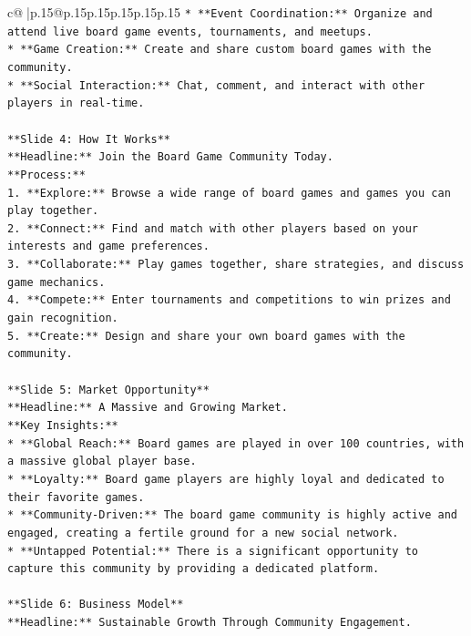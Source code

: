 \documentclass{article}
\begin{document}
{\begin{supertabular}{c@{$\;$}|p{.15\linewidth}@{}p{.15\linewidth}p{.15\linewidth}p{.15\linewidth}p{.15\linewidth}p{.15\linewidth}}
{{{\texttt{*   **Event Coordination:** Organize and attend live board game events, tournaments, and meetups.} \\
\texttt{*   **Game Creation:** Create and share custom board games with the community.} \\
\texttt{*   **Social Interaction:** Chat, comment, and interact with other players in real{-}time.} \\
\\ 
\texttt{**Slide 4: How It Works**} \\
\texttt{**Headline:** Join the Board Game Community Today.} \\
\texttt{**Process:**} \\
\texttt{1.  **Explore:** Browse a wide range of board games and games you can play together.} \\
\texttt{2.  **Connect:** Find and match with other players based on your interests and game preferences.} \\
\texttt{3.  **Collaborate:** Play games together, share strategies, and discuss game mechanics.} \\
\texttt{4.  **Compete:** Enter tournaments and competitions to win prizes and gain recognition.} \\
\texttt{5.  **Create:** Design and share your own board games with the community.} \\
\\ 
\texttt{**Slide 5: Market Opportunity**} \\
\texttt{**Headline:** A Massive and Growing Market.} \\
\texttt{**Key Insights:**} \\
\texttt{*   **Global Reach:** Board games are played in over 100 countries, with a massive global player base.} \\
\texttt{*   **Loyalty:** Board game players are highly loyal and dedicated to their favorite games.} \\
\texttt{*   **Community{-}Driven:** The board game community is highly active and engaged, creating a fertile ground for a new social network.} \\
\texttt{*   **Untapped Potential:** There is a significant opportunity to capture this community by providing a dedicated platform.} \\
\\ 
\texttt{**Slide 6: Business Model**} \\
\texttt{**Headline:** Sustainable Growth Through Community Engagement.} \\
}}}
\end{supertabular}}
\end{document}

